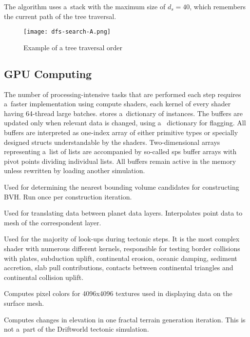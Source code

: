 The algorithm uses a~stack with the maximum size of $d_s=40$, which remembers the current path of the tree traversal.
\begin{figure}[ht]
\centering
\texttt{[image: dfs-search-A.png]}
\caption{Example of a tree traversal order}
\label{fig:dfs-traversal}
\end{figure}
\subsection{GPU Computing}
The number of processing-intensive tasks that are performed each step requires a~faster implementation using compute shaders, each kernel of every shader having 64-thread large batches.  stores a~dictionary of  instances. The buffers are updated only when relevant data is changed, using a~ dictionary for flagging. All buffers are interpreted as one-index array of either primitive types or specially designed structs understandable by the shaders. Two-dimensional arrays representing a~list of lists are accompanied by so-called sps buffer arrays with pivot points dividing individual lists. All buffers remain active in the memory unless rewritten by loading another simulation.
\begin{itemize}[\label={}]
\item[\textbf{BVH nearest neighbour shader}] Used for determining the nearest bounding volume candidates for constructing BVH. Run once per construction iteration.
\item[\textbf{Vertex data interpolation shader}]  Used for translating data between planet data layers. Interpolates point data to mesh of the correspondent layer.
\item[\textbf{Plate interactions shader}] Used for the majority of look-ups during tectonic steps.  It is the most complex shader with numerous different kernels, responsible for testing border collisions with plates, subduction uplift, continental erosion, oceanic damping, sediment accretion, slab pull contributions, contacts between continental triangles and continental collision uplift.
\item[\textbf{Overlay texture shader}] Computes pixel colors for 4096x4096 textures used in displaying data on the surface mesh.
\item[\textbf{Fractal terrain shader}] Computes changes in elevation in one fractal terrain generation iteration. This is not a~part of the Driftworld tectonic simulation.
\end{itemize}

